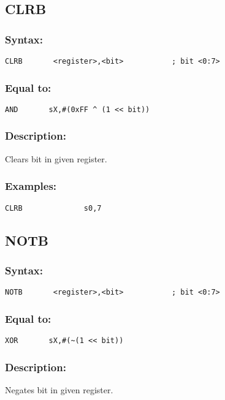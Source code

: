     \subsection{CLRB}
        \subsubsection{Syntax:}
            {
                \usecodefont
                \verb'CLRB       <register>,<bit>           ; bit <0:7>'
            }

        \subsubsection{Equal to:}
            {
                \usecodefont
                \verb'AND       sX,#(0xFF ^ (1 << bit))'
            }

        \subsubsection{Description:}
            Clears bit in given register.

        \subsubsection{Examples:}
            {
                \usecodefont
                \verb'CLRB              s0,7'\\
            }

    \subsection{NOTB}
        \subsubsection{Syntax:}
            {
                \usecodefont
                \verb'NOTB       <register>,<bit>           ; bit <0:7>'
            }

        \subsubsection{Equal to:}
            {
                \usecodefont
                \verb'XOR       sX,#(~(1 << bit))'
            }

        \subsubsection{Description:}
            Negates bit in given register.

